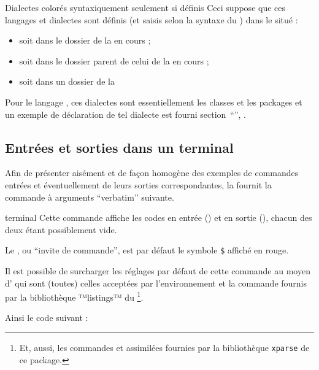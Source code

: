 \documentclass{letgut}
\begin{document}
\begin{dbwarning}{Dialectes colorés syntaxiquement seulement si définis}{}
  Ceci suppose que ces langages et dialectes sont définis (et saisis selon la
  syntaxe du ) dans le  situé :
  \begin{itemize}
  \item soit dans le dossier de la  en cours ;
  \item soit dans le dossier parent de celui de la  en cours ;
  \item soit  dans un dossier de la \tds{}
  \end{itemize}
\end{dbwarning}

Pour le langage , ces dialectes sont essentiellement les classes et
les packages  et un exemple de déclaration de tel dialecte est
fourni section~\enquote{},
.

\subsection{Entrées et sorties dans un terminal}
\label{sec:entrees-sorties}

Afin de présenter aisément et de façon homogène des exemples de commandes
entrées et éventuellement de leurs sorties correspondantes, la 
fournit la commande à arguments \enquote{verbatim} suivante.

\begin{docCommand}{terminal}{}
  Cette commande affiche les codes en entrée () et en sortie
  (), chacun des deux étant possiblement vide.

  Le , ou \enquote{invite de commande}, est par défaut le symbole
  \texttt{\$} affiché en rouge.

  Il est possible de surcharger les réglages par défaut de cette commande au
  moyen d' qui sont (toutes) celles acceptées par l'environnement
   et la commande 
  fournis par la bibliothèque ™listings™ du \footnote{Et,
    aussi, les commandes  et assimilées
    fournies par la bibliothèque \lstinline+xparse+ de ce package.}.
\end{docCommand}

Ainsi le code suivant :
\begingroup
\begin{ltx-code}
\end{ltx-code}
\end{document}
